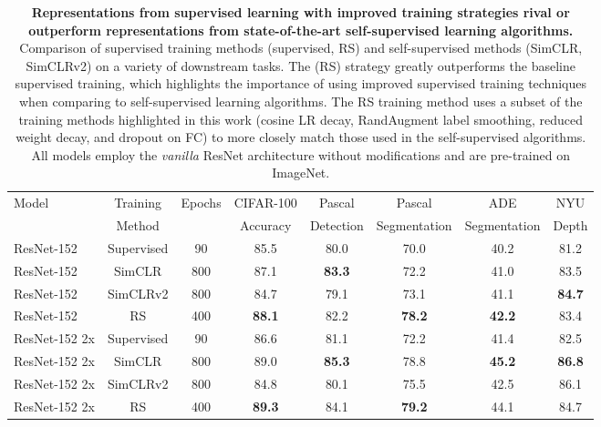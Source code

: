 \documentclass{article}
\begin{document}
\begin{table*}[h!]
    \centering
\begin{tabular}{lcc|ccccc}
      \toprule
      Model & Training & Epochs & CIFAR-100 & Pascal & Pascal & ADE & NYU \\
      & Method & &  Accuracy & Detection & Segmentation & Segmentation & Depth   \\
      \midrule
      ResNet-152 & Supervised & 90 & 85.5 & 80.0 & 70.0 & 40.2 & 81.2 \\
      ResNet-152 & SimCLR & 800 & 87.1 & \textcolor{myblue}{\textbf{83.3}} & 72.2 & 41.0 & 83.5 \\
      ResNet-152 & SimCLRv2 & 800 & 84.7 & 79.1 & 73.1 & 41.1 & \textcolor{myblue}{\textbf{84.7}} \\
      ResNet-152 & RS & 400 & \textcolor{myblue}{\textbf{88.1}} & 82.2 & \textcolor{myblue}{\textbf{78.2}} & \textcolor{myblue}{\textbf{42.2}} & 83.4 \\
      \midrule
      ResNet-152 2x & Supervised & 90 & 86.6 & 81.1 & 72.2 & 41.4 & 82.5 \\
      ResNet-152 2x & SimCLR & 800 & 89.0 & \textcolor{myblue}{\textbf{85.3}} & 78.8 & \textcolor{myblue}{\textbf{45.2}} & \textcolor{myblue}{\textbf{86.8}}\\
      ResNet-152 2x & SimCLRv2 & 800 & 84.8 & 80.1 & 75.5 & 42.5 & 86.1 \\
      ResNet-152 2x & RS & 400 & \textcolor{myblue}{\textbf{89.3}} & 84.1 & \textcolor{myblue}{\textbf{79.2}} & 44.1 & 84.7  \\
      \bottomrule
    \end{tabular}
    \caption{\textbf{Representations from supervised learning with improved training strategies rival or outperform representations from state-of-the-art self-supervised learning algorithms.} 
    Comparison of supervised training methods (supervised, RS) and self-supervised methods (SimCLR, SimCLRv2) on a variety of downstream tasks. 
    The (RS) strategy greatly outperforms the baseline supervised training, which highlights the importance of using improved supervised training techniques when comparing to self-supervised learning algorithms.
    The RS training method uses a subset of the training methods highlighted in this work (cosine LR decay, RandAugment label smoothing, reduced weight decay, and dropout on FC) to more closely match those used in the self-supervised algorithms. 
    All models employ the \emph{vanilla} ResNet architecture without modifications and are pre-trained on ImageNet.}
    \label{tab:suite_transfer} 
    \vspace{-0.15cm}
\end{table*}
\end{document}
